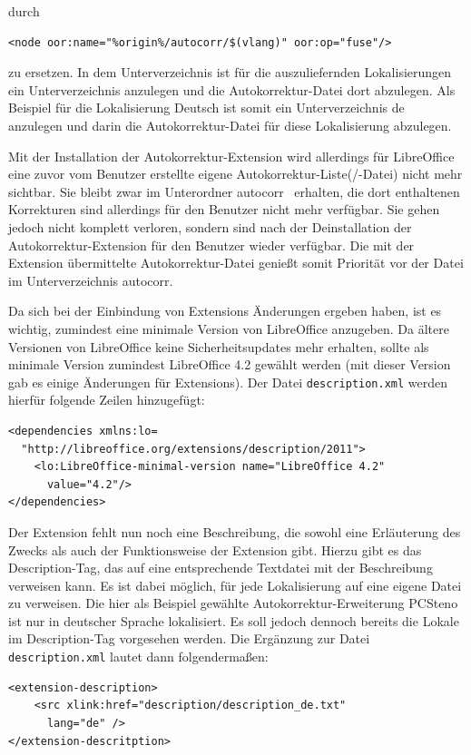 \documentclass[a4paper,10pt,pagesize,titlepage]{scrbook}
\begin{document}
durch
\begin{lstlisting}
<node oor:name="%origin%/autocorr/$(vlang)" oor:op="fuse"/>
\end{lstlisting}

zu ersetzen. In dem Unterverzeichnis ist für die auszuliefernden Lokalisierungen ein Unterverzeichnis anzulegen und die Autokorrektur-Datei dort abzulegen. Als Beispiel für die Lokalisierung Deutsch ist somit ein Unterverzeichnis \glqq de\grqq~ anzulegen und darin die Autokorrektur-Datei für diese Lokalisierung abzulegen.

Mit der Installation der Autokorrektur-Extension wird allerdings für LibreOffice eine zuvor vom Benutzer erstellte eigene Autokorrektur-Liste(/-Datei) nicht mehr sichtbar. Sie bleibt zwar im Unterordner \glqq autocorr\grqq~ erhalten, die dort enthaltenen Korrekturen sind allerdings für den Benutzer nicht mehr verfügbar. Sie gehen jedoch nicht komplett verloren, sondern sind nach der Deinstallation der Autokorrektur-Extension für den Benutzer wieder verfügbar. Die mit der Extension übermittelte Autokorrektur-Datei genießt somit Priorität vor der Datei im Unterverzeichnis \glqq autocorr\grqq.

Da sich bei der Einbindung von Extensions Änderungen ergeben haben, ist es wichtig, zumindest eine minimale Version von LibreOffice anzugeben. Da ältere Versionen von LibreOffice keine Sicherheitsupdates mehr erhalten, sollte als minimale Version zumindest LibreOffice 4.2 gewählt werden (mit dieser Version gab es einige Änderungen für Extensions). Der Datei \verb|description.xml| werden hierfür folgende Zeilen hinzugefügt:
\begin{lstlisting}
<dependencies xmlns:lo=
  "http://libreoffice.org/extensions/description/2011">
    <lo:LibreOffice-minimal-version name="LibreOffice 4.2" 
      value="4.2"/>
</dependencies>
\end{lstlisting}

Der Extension fehlt nun noch eine Beschreibung, die sowohl eine Erläuterung des Zwecks als auch der Funktionsweise der Extension gibt. Hierzu gibt es das Description-Tag, das auf eine entsprechende Textdatei mit der Beschreibung verweisen kann. Es ist dabei möglich, für jede Lokalisierung auf eine eigene Datei zu verweisen. Die hier als Beispiel gewählte Autokorrektur-Erweiterung PCSteno ist nur in deutscher Sprache lokalisiert. Es soll jedoch dennoch bereits die Lokale im Description-Tag vorgesehen werden. Die Ergänzung zur Datei \verb|description.xml| lautet dann folgendermaßen:
\begin{lstlisting}
<extension-description>
    <src xlink:href="description/description_de.txt" 
      lang="de" />
</extension-descritption>
\end{lstlisting}
\end{document}
